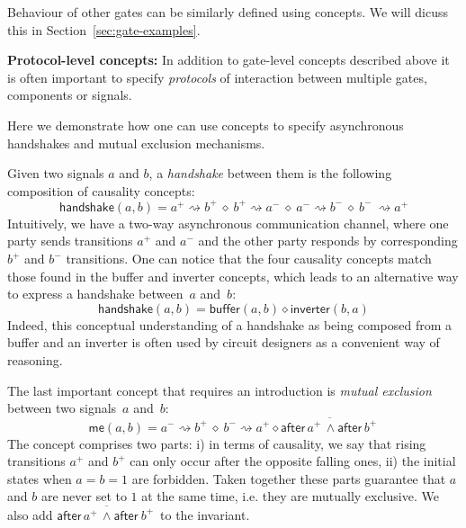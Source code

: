 \documentclass[british, journal]{IEEEtran}
\begin{document}
Behaviour of other gates can be similarly defined using concepts. We will dicuss
this in Section~\ref{sec:gate-examples}.

\textbf{Protocol-level concepts:} In addition to gate-level concepts
described above it is often important to specify \emph{protocols}
of interaction between multiple gates, components or signals. 

Here we demonstrate how one can use concepts to specify asynchronous handshakes
and mutual exclusion mechanisms.

Given two signals $a$ and $b$, a \emph{handshake} between them is
the following composition of causality concepts:
\[
\mathsf{handshake}(a, b)=a^{+}\!\rightsquigarrow\! b^{+}\ \diamond\
b^{+}\!\rightsquigarrow\! a^{-}\ \diamond\ a^{-}\!\rightsquigarrow\! b^{-}\
\diamond\ b^{-}\ \rightsquigarrow\! a^{+}
\]
Intuitively, we have a two-way asynchronous communication channel,
where one party sends transitions $a^{+}$ and $a^{-}$ and the other
party responds by corresponding $b^{+}$ and $b^{-}$ transitions.
One can notice that the four causality concepts match those found
in the buffer and inverter concepts, which leads to an alternative
way to express a handshake between~$a$ and~$b$:
\[
\mathsf{handshake}(a, b)=\mathsf{buffer}(a, b) \diamond\mathsf{inverter}(b, a)
\]
Indeed, this conceptual understanding of a handshake as being composed
from a buffer and an inverter is often used by circuit designers as
a convenient way of reasoning.

%

The last important concept that requires an introduction is \emph{mutual
exclusion} between two signals~$a$ and~$b$:
\[
\mathsf{me}(a, b) = a^{-}\rightsquigarrow b^{+}\ \diamond\ b^{-}\rightsquigarrow
a^{+}\diamond\overline{\mathsf{after}\,a^{+} \, \wedge\mathsf{after}\,b^{+}\, }
\]
The concept comprises two parts: i) in terms of causality, we say
that rising transitions $a^{+}$ and $b^{+}$ can only occur after
the opposite falling ones, ii) the initial states when $a=b=1$ are
forbidden. Taken together these parts guarantee that $a$ and
$b$ are never set to $1$ at the same time, i.e. they are mutually
exclusive. We also add $\overline{\mathsf{after}\, a^{+} \,
\wedge\mathsf{after}\ b^{+}\,}$
to the invariant.
\end{document}
